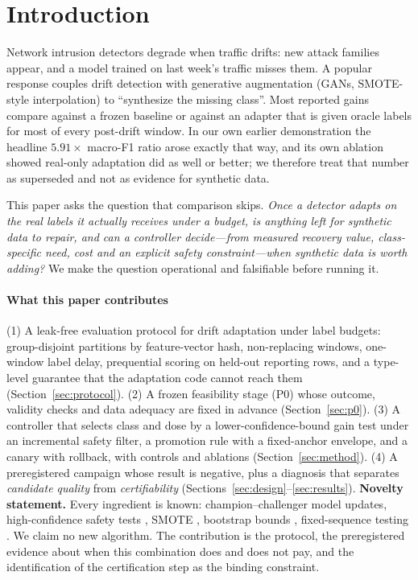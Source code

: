 \documentclass[conference]{IEEEtran}
\begin{document}
\section{Introduction}
Network intrusion detectors degrade when traffic drifts: new attack families appear, and a model trained on
last week's traffic misses them. A popular response couples drift detection with generative augmentation (GANs,
SMOTE-style interpolation) to ``synthesize the missing class''. Most reported gains compare against a frozen
baseline or against an adapter that is given oracle labels for most of every post-drift window. In our own earlier
demonstration the headline $5.91\times$ macro-F1 ratio arose exactly that way, and its own ablation showed real-only adaptation
did as well or better; we therefore treat that number as superseded and not as evidence for synthetic data.

This paper asks the question that comparison skips. \emph{Once a detector adapts on the real labels it actually receives
under a budget, is anything left for synthetic data to repair, and can a controller decide---from measured recovery value,
class-specific need, cost and an explicit safety constraint---when synthetic data is worth adding?} We make the question
operational and falsifiable before running it.

\paragraph*{What this paper contributes}
(1) A leak-free evaluation protocol for drift adaptation under label budgets: group-disjoint partitions by feature-vector
hash, non-replacing windows, one-window label delay, prequential scoring on held-out reporting rows, and a type-level
guarantee that the adaptation code cannot reach them (Section~\ref{sec:protocol}).
(2) A frozen feasibility stage (P0) whose outcome, validity checks and data adequacy are fixed in advance (Section~\ref{sec:p0}).
(3) A controller that selects class and dose by a lower-confidence-bound gain test under an incremental safety filter, a
promotion rule with a fixed-anchor envelope, and a canary with rollback, with controls and ablations (Section~\ref{sec:method}).
(4) A preregistered campaign whose result is negative, plus a diagnosis that separates \emph{candidate quality} from
\emph{certifiability} (Sections~\ref{sec:design}--\ref{sec:results}).
\textbf{Novelty statement.} Every ingredient is known: champion--challenger model updates, high-confidence safety tests
\cite{thomas2015,thomas2019}, SMOTE \cite{chawla2002smote}, bootstrap bounds \cite{efron1979}, fixed-sequence testing
\cite{marcus1976}. We claim no new algorithm. The contribution is the protocol, the preregistered evidence about when this
combination does and does not pay, and the identification of the certification step as the binding constraint.
\end{document}
